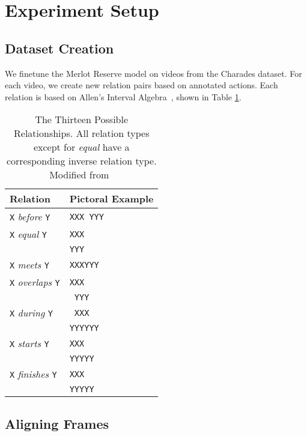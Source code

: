 \section{Experiment Setup}
\label{sec:setup}


\subsection{Dataset Creation}
\label{ssec:data}

We finetune the Merlot Reserve model on videos from the Charades dataset. For
each video, we create new relation pairs based on annotated actions. Each
relation is based on Allen's Interval Algebra~\citep{allen1983interval}, shown
in Table \ref{tab:allen_interval}. 

\begin{table}[htpb]
	\centering
	\caption{The Thirteen Possible Relationships. All relation types except for
		\textit{equal} have a corresponding inverse relation type. Modified
		from~\cite{allen1983interval}}
	\label{tab:allen_interval}
	\begin{tabular}{ll}
	Relation & Pictoral Example \\
	\hline
	\texttt{X} \textit{before} \texttt{Y} & \texttt{XXX YYY} \\
	\texttt{X} \textit{equal} \texttt{Y} & \texttt{XXX} \\
					   & \texttt{YYY} \\
	\texttt{X} \textit{meets} \texttt{Y} & \texttt{XXXYYY} \\
	\texttt{X} \textit{overlaps} \texttt{Y} & \texttt{XXX} \\
						& \texttt{ YYY} \\
	\texttt{X} \textit{during} \texttt{Y} & \texttt{ XXX} \\
						& \texttt{YYYYYY} \\
	\texttt{X} \textit{starts} \texttt{Y} & \texttt{XXX} \\
						& \texttt{YYYYY} \\
	\texttt{X} \textit{finishes} \texttt{Y} & \texttt{\space\space XXX} \\
							& \texttt{YYYYY} \\
	\end{tabular}
\end{table}

\subsection{Aligning Frames}
\label{ssec:frames}


